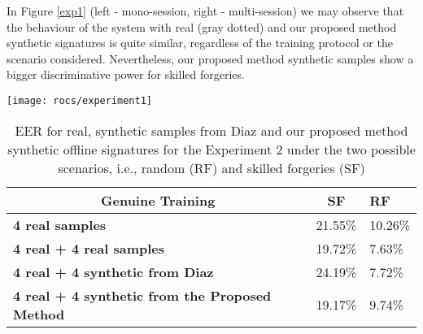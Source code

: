 In Figure \ref{exp1} (left - mono-session, right - multi-session) we
may observe that the behaviour of the system with real (gray dotted) and our proposed method synthetic signatures is quite similar, regardless of
the training protocol or the scenario considered. Nevertheless, our proposed method synthetic samples show a bigger discriminative power for skilled forgeries.
\begin{figure*}[!htb]
	\centering
	\texttt{[image: rocs/experiment1]}
	\caption{DET curves for real offline signatures and synthetic signatures (from Diaz and our proposed method), for the first experiment (mono-session and multi-session enrollment), for the two scenarios considered (random and skilled impostors)}
	\label{exp1}
\end{figure*}
\begin{table}[!htb]
	\renewcommand{\arraystretch}{1.3}
	\caption{EER for real, synthetic samples from Diaz \cite{diaz2014generation} and our proposed method synthetic offline signatures for the Experiment 2 under the two possible scenarios, i.e., random (RF) and skilled forgeries (SF)}
	\label{exp2_results_table}
	\centering
	\begin{tabular}{|l|l|l|}
		\hline
		\multicolumn{1}{|c|}{\textbf{Genuine Training}} & \multicolumn{1}{c|}{\textbf{SF}} & \textbf{RF} \\ \hline
		\textbf{4 real samples}                                         & 21.55\%                     & 10.26\%                         \\ \hline
		\textbf{4 real + 4 real samples}                       & 19.72\%                      & 7.63\%                        \\ \hline
		\textbf{4 real + 4 synthetic from Diaz}                           & 24.19\%                         & 7.72\%                \\ \hline
		\textbf{4 real + 4 synthetic from the Proposed Method}                           & 19.17\%         & 9.74\%                        \\ \hline
	\end{tabular}

\end{table}

